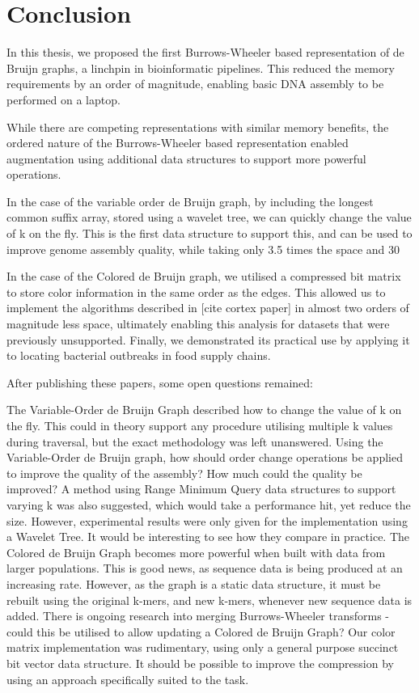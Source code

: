 \chapter{Conclusion}
\label{sec:conclusion}

In this thesis, we proposed the first Burrows-Wheeler based representation of de Bruijn graphs, a linchpin in bioinformatic pipelines. This reduced the memory requirements by an order of magnitude, enabling basic DNA assembly to be performed on a laptop.

While there are competing representations with similar memory benefits, the ordered nature of the Burrows-Wheeler based representation enabled augmentation using additional data structures to support more powerful operations.

In the case of the variable order de Bruijn graph, by including the longest common suffix array, stored using a wavelet tree, we can quickly change the value of k on the fly. This is the first data structure to support this, and can be used to improve genome assembly quality, while taking only 3.5 times the space and 30%

In the case of the Colored de Bruijn graph, we utilised a compressed bit matrix to store color information in the same order as the edges. This allowed us to implement the algorithms described in [cite cortex paper] in almost two orders of magnitude less space, ultimately enabling this analysis for datasets that were previously unsupported. Finally, we demonstrated its practical use by applying it to locating bacterial outbreaks in food supply chains.

After publishing these papers, some open questions remained:

The Variable-Order de Bruijn Graph described how to change the value of k on the fly. This could in theory support any procedure utilising multiple k values during traversal, but the exact methodology was left unanswered. Using the Variable-Order de Bruijn graph, how should order change operations be applied to improve the quality of the assembly? How much could the quality be improved?
A method using Range Minimum Query data structures to support varying k was also suggested, which would take a performance hit, yet reduce the size. However, experimental results were only given for the implementation using a Wavelet Tree. It would be interesting to see how they compare in practice.
The Colored de Bruijn Graph becomes more powerful when built with data from larger populations. This is good news, as sequence data is being produced at an increasing rate. However, as the graph is a static data structure, it must be rebuilt using the original k-mers, and new k-mers, whenever new sequence data is added. There is ongoing research into merging Burrows-Wheeler transforms - could this be utilised to allow updating a Colored de Bruijn Graph?
Our color matrix implementation was rudimentary, using only a general purpose succinct bit vector data structure. It should be possible to improve the compression by using an approach specifically suited to the task.

